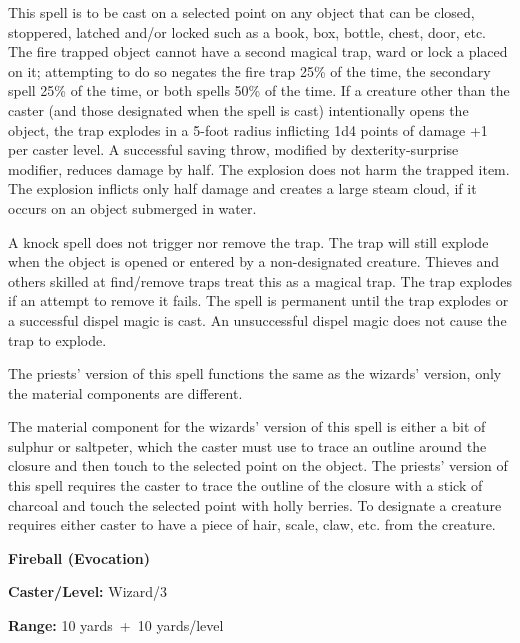 \begin{multicols}{2}
\begin{minipage}{\columnwidth}
\end{minipage}

This spell is to be cast on a selected point on any object that can be closed, stoppered, latched and/or locked such as a book, box, bottle, chest, door, etc.  The fire trapped object cannot have a second magical trap, ward or lock a placed on it; attempting to do so negates the fire trap 25\% of the time, the secondary spell 25\% of the time, or both spells 50\% of the time.  If a creature other than the caster (and those designated when the spell is cast) intentionally opens the object, the trap explodes in a 5-foot radius inflicting 1d4 points of damage +1 per caster level.  A successful saving throw, modified by dexterity-surprise modifier, reduces damage by half.  The explosion does not harm the trapped item.  The explosion inflicts only half damage and creates a large steam cloud, if it occurs on an object submerged in water.

A knock spell does not trigger nor remove the trap.  The trap will still explode when the object is opened or entered by a non-designated creature.  Thieves and others skilled at find/remove traps treat this as a magical trap.  The trap explodes if an attempt to remove it fails.  The spell is permanent until the trap explodes or a successful dispel magic is cast.  An unsuccessful dispel magic does not cause the trap to explode. 

The priests' version of this spell functions the same as the wizards' version, only the material components are different.  

The material component for the wizards' version of this spell is either a bit of sulphur or saltpeter, which the caster must use to trace an outline around the closure and then touch to the selected point on the object.  The priests' version of this spell requires the caster to trace the outline of the closure with a stick of charcoal and touch the selected point with holly berries.  To designate a creature requires either caster to have a piece of hair, scale, claw, etc. from the creature.

\vspace{1em}

\noindent
\begin{minipage}{\columnwidth}

\noindent \textbf{Fireball (Evocation)}

\noindent \textbf{Caster/Level:} Wizard/3

\noindent \textbf{Range:} 10 yards~+~10 yards/level


\end{minipage}
\end{multicols}

